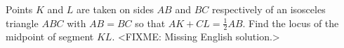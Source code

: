 \problem{}
Points $K$ and $L$ are taken on sides $AB$ and $BC$ respectively of an isosceles
triangle $ABC$ with $AB = BC$ so that $AK + CL = \frac{1}{2} AB$.
Find the locus of the midpoint of segment $KL$.
\solution
<FIXME: Missing English solution.>
\endproblem
